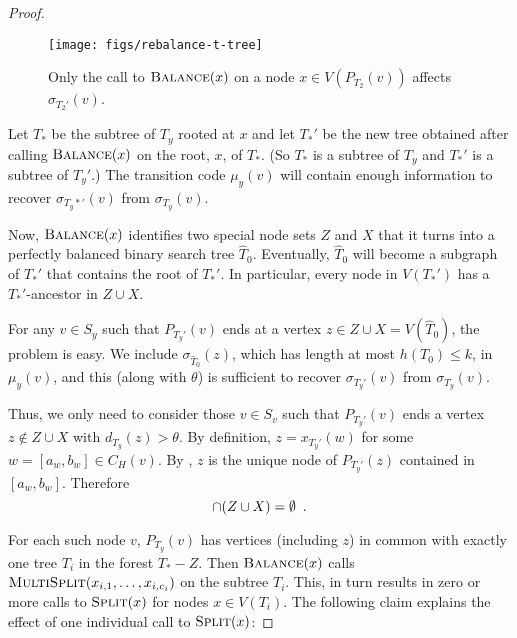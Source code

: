 \documentclass[kpfonts]{patmorin}
\let\le\leqslant
\begin{document}
\begin{proof}
  \begin{figure}
    \begin{center}
      \texttt{[image: figs/rebalance-t-tree]}
    \end{center}
    \caption{Only the call to $\textsc{Balance}(x)$ on a node $x\in V(P_{T_2}(v))$ affects $\sigma_{T_2'}(v)$.}
  \end{figure}
  
  Let $T_*$ be the subtree of $T_y$ rooted at $x$ and let $T_*'$ be the new tree obtained after calling $\textsc{Balance}(x)$ on the root, $x$, of $T_*$. (So $T_*$ is a subtree of $T_y$ and $T_*'$ is a subtree of $T_y'$.)
  The transition code $\mu_y(v)$ will contain enough information to recover $\sigma_{T_y*'}(v)$ from $\sigma_{T_y}(v)$. 
  
  Now, $\textsc{Balance}(x)$ identifies two special node sets $Z$ and $X$ that it turns into a perfectly balanced binary search tree $\hat{T}_0$.  Eventually, $\hat{T}_0$ will become a subgraph of $T_*'$ that contains the root of $T_*'$.   In particular, every node in $V(T_*')$ has a $T_*'$-ancestor in $Z\cup X$.
  
  For any $v\in S_y$ such that $P_{T_y'}(v)$ ends at a vertex $z\in Z\cup X=V(\hat{T}_0)$, the problem is easy.  We include $\sigma_{\hat{T}_0}(z)$, which has length at most $h(T_0)\le k$, in $\mu_y(v)$, and this (along with $\theta$) is sufficient to recover $\sigma_{T_y'}(v)$ from $\sigma_{T_y}(v)$.

  Thus, we only need to consider those $v\in S_v$ such that $P_{T_y'}(v)$ ends a vertex $z\not\in Z\cup X$ with $d_{T_y}(z)>\theta$.    By definition,  $z=x_{T_y'}(w)$ for some $w=[a_w,b_w]\in C_H(v)$.  By , $z$ is the unique node of $P_{T_y'}(z)$ contained in $[a_w,b_w]$.  Therefore
  \begin{equation}  
    [a_w,b_w]\cap (Z\cup X)=\emptyset \enspace . \eqlabel{empty}
  \end{equation}
  
  For each such node $v$, $P_{T_y}(v)$ has vertices (including $z$) in common with exactly one tree $T_{i}$ in the forest $T_*-Z$.  Then $\textsc{Balance}(x)$ calls $\textsc{MultiSplit}(x_{i,1},\ldots,x_{i,c_i})$ on the subtree $T_{i}$.  This, in turn results in zero or more calls to $\textsc{Split}(x)$ for nodes $x\in V(T_{i})$. The following claim explains the effect of one individual call to $\textsc{Split}(x)$:
  

\end{proof}
\end{document}
